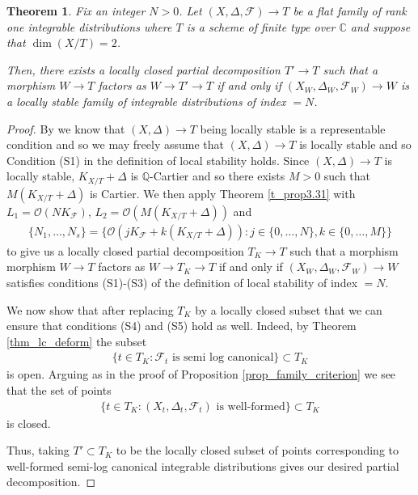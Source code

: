 \documentclass[12pt, a4paper]{amsart}
\newcounter{Theorem}
\newtheorem{theorem}{Theorem}[section]
\theoremstyle{definition}
\theoremstyle{named}
\begin{document}
\begin{theorem}
\label{thm_local_stab_rep}
Fix an integer $N>0$.  Let $(X, \Delta, \mathcal F) \rightarrow T$ be a flat family
    of rank one integrable distributions where $T$ is a scheme of finite type over $\mathbb C$
    and suppose that $\dim (X/T) = 2$.


    
    Then, there exists a locally closed partial decomposition $T' \rightarrow T$ such that 
    a morphism $W \rightarrow T$ factors as $W \rightarrow T' \rightarrow T$
    if and only if $(X_W, \Delta_W, \mathcal F_W) \rightarrow W$ is a locally stable family of integrable distributions of index $=N$.
\end{theorem}
\begin{proof}
    By \cite[Theorem 3.2 (see also the proof of Theorem 6.24)]{modbook}
    we know that $(X, \Delta) \rightarrow T$ being locally stable is a representable condition and so we may freely assume that $(X, \Delta) \rightarrow T$ is locally stable and so Condition (S1) in the definition of local stability holds. Since $(X, \Delta) \to T$ is locally stable, $K_{X/T}+\Delta$ is $\mathbb Q$-Cartier and so there exists $M>0$ such that $M(K_{X/T} +\Delta)$ is Cartier. We then apply Theorem \ref{t_prop3.31} with $L_1 = \mathcal O(NK_{\mathcal F})$, $L_2 = \mathcal O(M(K_{X/T}+\Delta))$ and \begin{align*}\{N_1, \dots, N_s\} = \{\mathcal O(jK_{\mathcal F}+k(K_{X/T}+\Delta)): j \in \{0, \dots, N\}, k \in \{0, \dots, M\}\}\end{align*} to give us a locally closed partial decomposition $T_K \to T$
 such that a morphism
 morphism $W \to T$ factors as $W \to T_K \to T$
    if and only if $(X_W, \Delta_W, \mathcal F_W) \to W$
    satisfies conditions (S1)-(S3) of the definition of local stability of index $=N$.
    
    
    We now show that after replacing $T_K$ by a locally closed subset that we can ensure that conditions (S4) and (S5) hold as well.
    Indeed, by Theorem \ref{thm_lc_deform} the subset \begin{align*}\{t \in T_K: \mathcal F_t \text{ is semi log canonical}\} \subset T_K\end{align*} is open.
Arguing as in the proof of Proposition \ref{prop_family_criterion} we see that the set of 
    points \begin{align*}\{t \in T_K: (X_t, \Delta_t, \mathcal F_t) \text{ is well-formed}\} \subset T_K\end{align*}
    is closed.
    
    
    Thus, taking $T' \subset T_K$ to be the locally closed subset of points corresponding to well-formed semi-log canonical integrable distributions gives our desired partial decomposition.
\end{proof}
\end{document}
